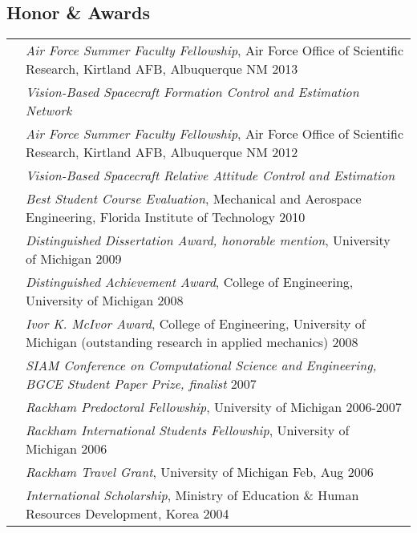 \documentclass[10pt]{article}
\begin{document}
\vspace*{0.2cm}

\subsection*{Honor \& Awards}
\setlength{\tabcolsep}{0cm}
\begin{tabularx}{\textwidth}{>{\setlength{\hsize}{0.5cm}}X X}%
& \textit{Air Force Summer Faculty Fellowship}, Air Force Office of Scientific Research, Kirtland AFB, Albuquerque NM \hfill 2013\\
& \quad \textit{Vision-Based Spacecraft Formation Control and Estimation Network}\vspace*{0.08cm}\\
%
& \textit{Air Force Summer Faculty Fellowship}, Air Force Office of Scientific Research, Kirtland AFB, Albuquerque NM \hfill 2012\\
& \quad \textit{Vision-Based Spacecraft Relative Attitude Control and Estimation}\vspace*{0.08cm}\\
%
& \textit{Best Student Course Evaluation}, Mechanical and Aerospace Engineering, Florida Institute of Technology
 \hfill 2010 \\
& \textit{Distinguished Dissertation Award, honorable mention}, University of Michigan
 \hfill 2009 \\
& \textit{Distinguished Achievement Award}, College of Engineering, University of Michigan
 \hfill 2008\\
& \textit{Ivor K. McIvor Award}, College of Engineering, University of Michigan
(outstanding research in applied mechanics) \hfill 2008\\
& \textit{SIAM Conference on Computational Science and Engineering, BGCE Student Paper Prize, finalist} \hfill 2007\\
& \textit{Rackham Predoctoral Fellowship}, University of Michigan \hfill 2006-2007\\
& \textit{Rackham International Students Fellowship}, University of Michigan \hfill 2006\\
& \textit{Rackham Travel Grant}, University of Michigan \hfill Feb, Aug 2006\\
& \textit{International Scholarship}, Ministry of Education \& Human
Resources Development, Korea \hfill 2004
\end{tabularx}


\renewcommand{\thefootnote}{}
\renewcommand\footnotemark{}
\end{document}

